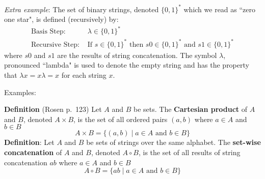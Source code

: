 \documentclass[12pt, oneside]{article}
\begin{document}
\vfill




\newpage
{\it Extra example}:  The set of binary strings, denoted $\{0,1\}^*$ which we read as ``zero one star", 
is defined (recursively) by:
\[
\begin{array}{ll}
\textrm{Basis Step: } & \lambda \in \{0,1\}^* \\
\textrm{Recursive Step: } & \textrm{If } s \in \{0,1\}^*\textrm{ then } s0 \in  \{0,1\}^* \textrm{ and } s1 \in  \{0,1\}^*
\end{array}
\]
where $s0$ and $s1$ are the results of string concatenation. The symbol $\lambda$, pronounced ``lambda" is used to denote the empty string
and has the property that $\lambda x = x \lambda = x$ for each string $x$.

Examples: 



\vfill 



{\bf Definition} (Rosen p.\ 123) Let $A$ and $B$ be sets.  The {\bf Cartesian product} of $A$ and $B$, denoted
$A \times B$, is the set of all ordered pairs $(a,b)$ where $a \in A$ and $b \in B$
\[
A \times B = \{ (a,b) \mid a \in A \text{ and } b \in B \}
\]
{\bf Definition}: Let $A$ and $B$ be sets of strings over the same alphabet. The {\bf set-wise concatenation} 
of $A$ and $B$, denoted $A \circ B$, is the set of all results of string concatenation $ab$ where $a \in A$ and $b \in B$
\[
A \circ B = \{ ab \mid a \in A \text{ and } b \in B \}
\]
\end{document}
